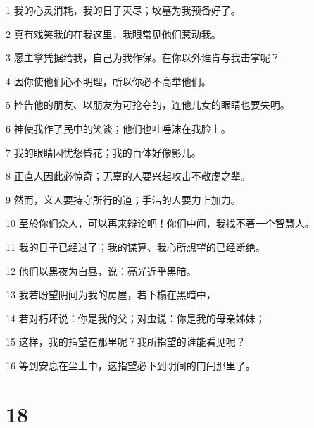 \par 1 我的心灵消耗，我的日子灭尽；坟墓为我预备好了。
\par 2 真有戏笑我的在我这里，我眼常见他们惹动我。
\par 3 愿主拿凭据给我，自己为我作保。在你以外谁肯与我击掌呢？
\par 4 因你使他们心不明理，所以你必不高举他们。
\par 5 控告他的朋友、以朋友为可抢夺的，连他儿女的眼睛也要失明。
\par 6 神使我作了民中的笑谈；他们也吐唾沫在我脸上。
\par 7 我的眼睛因忧愁昏花；我的百体好像影儿。
\par 8 正直人因此必惊奇；无辜的人要兴起攻击不敬虔之辈。
\par 9 然而，义人要持守所行的道；手洁的人要力上加力。
\par 10 至於你们众人，可以再来辩论吧！你们中间，我找不著一个智慧人。
\par 11 我的日子已经过了；我的谋算、我心所想望的已经断绝。
\par 12 他们以黑夜为白昼，说：亮光近乎黑暗。
\par 13 我若盼望阴间为我的房屋，若下榻在黑暗中，
\par 14 若对朽坏说：你是我的父；对虫说：你是我的母亲姊妹；
\par 15 这样，我的指望在那里呢？我所指望的谁能看见呢？
\par 16 等到安息在尘土中，这指望必下到阴间的门闩那里了。

\chapter{18}

